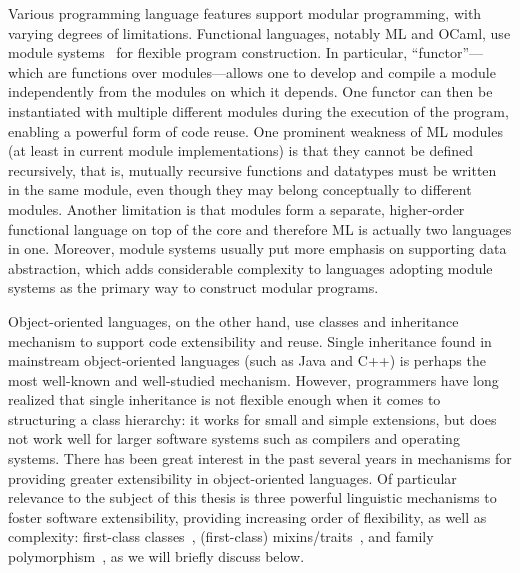 Various programming language features support modular programming, with varying
degrees of limitations. Functional languages, notably ML and OCaml, use module
systems~\citep{MacQueen_1984} for flexible program construction. In particular,
``functor''---which are functions over modules---allows
one to develop and compile a module independently from the modules on which it
depends. One functor can then be instantiated with multiple different modules
during the execution of the program, enabling a powerful form of code reuse. One
prominent weakness of ML modules (at least in current module implementations) is
that they cannot be defined recursively, that is, mutually recursive functions
and datatypes must be written in the same module, even though they may belong
conceptually to different modules. Another limitation is that modules form a
separate, higher-order functional language on top of the core and therefore ML
is actually two languages in one. Moreover, module systems usually put more
emphasis on supporting data abstraction, which adds considerable complexity to
languages adopting module systems as the primary way to construct modular
programs.

Object-oriented languages, on the other hand, use classes and inheritance
mechanism to support code extensibility and reuse. Single inheritance found in
mainstream object-oriented languages (such as Java and C++) is perhaps the most
well-known and well-studied mechanism. However, programmers have long realized
that single inheritance is not flexible enough when it comes to structuring a
class hierarchy: it works for small and simple extensions, but does not work
well for larger software systems such as compilers and operating systems. There
has been great interest in the past several years in mechanisms for providing
greater extensibility in object-oriented languages. Of particular relevance to
the subject of this thesis is three powerful linguistic mechanisms to foster software
extensibility, providing increasing order of flexibility, as well as complexity:
first-class classes~\citep{DBLP:conf/oopsla/TakikawaSDTF12}, (first-class)
mixins/traits~\citep{bracha1990mixin, scharli2003traits}, and family
polymorphism~\citep{Ernst_2001}, as we will briefly discuss below.


